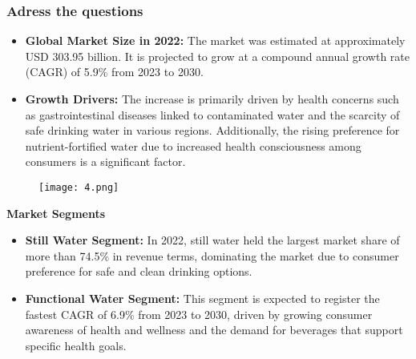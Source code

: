 \documentclass{article}
\begin{document}
\subsubsection{Adress the questions}
\begin{itemize}
    \item \textbf{Global Market Size in 2022:} The market was estimated at approximately USD 303.95 billion. It is projected to grow at a compound annual growth rate (CAGR) of 5.9\% from 2023 to 2030.
    \item \textbf{Growth Drivers:} The increase is primarily driven by health concerns such as gastrointestinal diseases linked to contaminated water and the scarcity of safe drinking water in various regions. Additionally, the rising preference for nutrient-fortified water due to increased health consciousness among consumers is a significant factor.
    
\end{itemize}
\begin{figure}[H]
\centering
\texttt{[image: 4.png]}
\label{fig:unique_label_1}
\end{figure}

\textbf{Market Segments}\par
\begin{itemize}
    \item \textbf{Still Water Segment:} In 2022, still water held the largest market share of more than 74.5\% in revenue terms, dominating the market due to consumer preference for safe and clean drinking options.
    \item \textbf{Functional Water Segment:} This segment is expected to register the fastest CAGR of 6.9\% from 2023 to 2030, driven by growing consumer awareness of health and wellness and the demand for beverages that support specific health goals.
\end{itemize}
\end{document}
